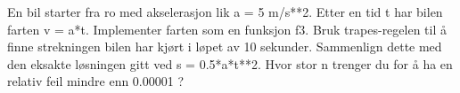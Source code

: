 %
%
En bil starter fra ro med akselerasjon lik a = 5 m/s**2. Etter en tid t har bilen farten v = a*t. Implementer farten som en funksjon f3. Bruk trapes-regelen til å finne strekningen bilen har kjørt i løpet av 10 sekunder. Sammenlign dette med den eksakte løsningen gitt ved s = 0.5*a*t**2. Hvor stor n trenger du for å ha en relativ feil mindre enn 0.00001 ?
